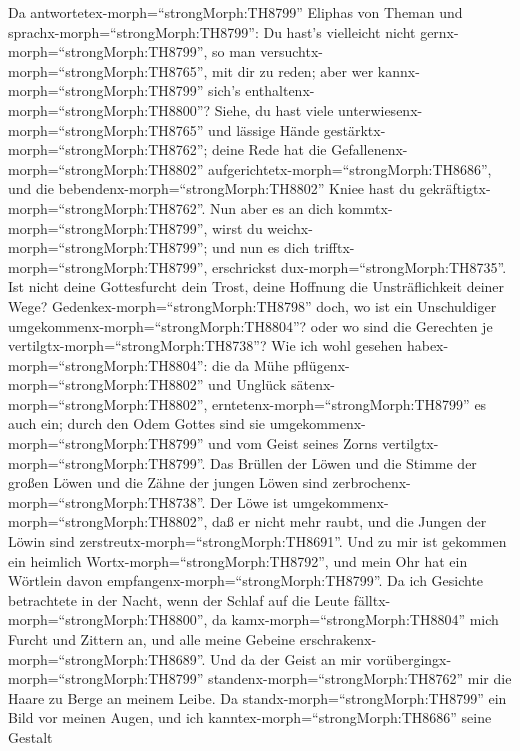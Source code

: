  Da antwortetex-morph=``strongMorph:TH8799'' Eliphas von
Theman und sprachx-morph=``strongMorph:TH8799'':  Du hast's
vielleicht nicht gernx-morph=``strongMorph:TH8799'', so man
versuchtx-morph=``strongMorph:TH8765'', mit dir zu reden; aber wer
kannx-morph=``strongMorph:TH8799'' sich's
enthaltenx-morph=``strongMorph:TH8800''?  Siehe, du hast
viele unterwiesenx-morph=``strongMorph:TH8765'' und lässige Hände
gestärktx-morph=``strongMorph:TH8762'';  deine Rede hat die
Gefallenenx-morph=``strongMorph:TH8802''
aufgerichtetx-morph=``strongMorph:TH8686'', und die
bebendenx-morph=``strongMorph:TH8802'' Kniee hast du
gekräftigtx-morph=``strongMorph:TH8762''.  Nun aber es an
dich kommtx-morph=``strongMorph:TH8799'', wirst du
weichx-morph=``strongMorph:TH8799''; und nun es dich
trifftx-morph=``strongMorph:TH8799'', erschrickst
dux-morph=``strongMorph:TH8735''.  Ist nicht deine
Gottesfurcht dein Trost, deine Hoffnung die Unsträflichkeit deiner Wege?
 Gedenkex-morph=``strongMorph:TH8798'' doch, wo ist ein
Unschuldiger umgekommenx-morph=``strongMorph:TH8804''? oder wo sind die
Gerechten je vertilgtx-morph=``strongMorph:TH8738''?  Wie
ich wohl gesehen habex-morph=``strongMorph:TH8804'': die da Mühe
pflügenx-morph=``strongMorph:TH8802'' und Unglück
sätenx-morph=``strongMorph:TH8802'',
erntetenx-morph=``strongMorph:TH8799'' es auch ein;  durch
den Odem Gottes sind sie umgekommenx-morph=``strongMorph:TH8799'' und
vom Geist seines Zorns vertilgtx-morph=``strongMorph:TH8799''.
 Das Brüllen der Löwen und die Stimme der großen Löwen und
die Zähne der jungen Löwen sind
zerbrochenx-morph=``strongMorph:TH8738''.  Der Löwe ist
umgekommenx-morph=``strongMorph:TH8802'', daß er nicht mehr raubt, und
die Jungen der Löwin sind zerstreutx-morph=``strongMorph:TH8691''.
 Und zu mir ist gekommen ein heimlich
Wortx-morph=``strongMorph:TH8792'', und mein Ohr hat ein Wörtlein davon
empfangenx-morph=``strongMorph:TH8799''.  Da ich Gesichte
betrachtete in der Nacht, wenn der Schlaf auf die Leute
fälltx-morph=``strongMorph:TH8800'',  da
kamx-morph=``strongMorph:TH8804'' mich Furcht und Zittern an, und alle
meine Gebeine erschrakenx-morph=``strongMorph:TH8689''. 
Und da der Geist an mir vorübergingx-morph=``strongMorph:TH8799''
standenx-morph=``strongMorph:TH8762'' mir die Haare zu Berge an meinem
Leibe.  Da standx-morph=``strongMorph:TH8799'' ein Bild vor
meinen Augen, und ich kanntex-morph=``strongMorph:TH8686'' seine Gestalt
